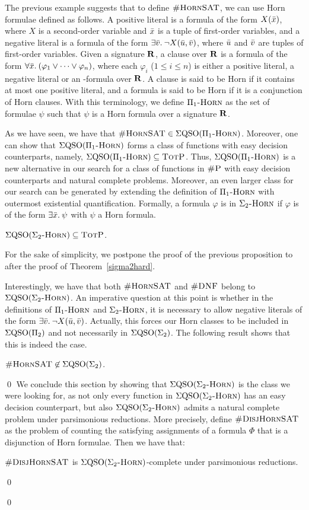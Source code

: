 The previous example suggests that to define $\textsc{\#HornSAT}$, we can use Horn formulae defined as follows. 
A positive literal is a formula of the form $X(\bar{x})$, where $X$ is a second-order variable and $\bar{x}$ is a tuple of first-order variables, and a negative literal is a formula of the form $\exists{\bar{v}}.\: \neg X(\bar{u},\bar{v})$, where $\bar{u}$ and $\bar{v}$ are tuples of first-order variables. Given a signature $\mathbf{R}$, a clause over $\mathbf{R}$ is a formula of the form $\forall{\bar{x}}.\: (\varphi_1 \vee \cdots \vee \varphi_n)$, 
where each $\varphi_i$ ($1 \leq i \leq n$) is either a positive literal, a negative literal or an \fo-formula over $\mathbf{R}$.  A clause is said to be Horn if it contains at most one positive literal, and a formula is said to be Horn if it is a conjunction of Horn clauses. With this terminology, we define $\Pi_1\textsc{-Horn}$ as the set of formulae $\psi$ such that $\psi$ is a Horn formula over a signature $\mathbf{R}$. 

As we have seen, we have that $\textsc{\#HornSAT} \in \Sigma{\rm QSO}(\Pi_1\textsc{-Horn})$. Moreover, one can show that $\Sigma{\rm QSO}(\Pi_1\textsc{-Horn})$ forms a class of functions with easy decision counterparts, namely, $\Sigma{\rm QSO}(\Pi_1\textsc{-Horn}) \subseteq \text{\sc TotP}$.
Thus, $\Sigma{\rm QSO}(\Pi_1\textsc{-Horn})$ is a new alternative in our search for a class of functions in $\text{\sc \#P}$ with easy decision counterparts and natural complete problems. Moreover, an even larger class for our search can be generated by extending the definition of $\Pi_1\textsc{-Horn}$ with outermost existential quantification. 
Formally, a formula $\varphi$ is in $\Sigma_2\textsc{-Horn}$ if $\varphi$ is of the form $\exists{\bar x}.\: \psi$ with $\psi$ a Horn formula. 

\begin{prop}\label{prop:ehorn-pe}
$\Sigma{\rm QSO}(\Sigma_2\textsc{-Horn}) \subseteq \text{\sc TotP}$.
\end{prop}
For the sake of simplicity, we postpone the proof of the previous proposition to after the proof of Theorem~\ref{sigma2hard}.

Interestingly, we have that both $\textsc{\#HornSAT}$ and $\textsc{\#DNF}$ belong to $\Sigma{\rm QSO}(\Sigma_2\textsc{-Horn})$. 
An imperative question at this point is whether in the definitions of $\Pi_1\textsc{-Horn}$ and $\Sigma_2\textsc{-Horn}$, it is necessary to allow negative literals of the form $\exists{\bar{v}}.\: \neg X(\bar{u},\bar{v})$. Actually, this forces our Horn classes to be included in $\Sigma{\rm QSO}(\Pi_{2})$ and not necessarily in $\Sigma{\rm QSO}(\Sigma_{2})$. The following result shows that this is indeed the case.

\begin{prop}\label{prop:hsat-not-sigma2}	
$\textsc{\#HornSAT} \not\in \Sigma{\rm QSO}(\Sigma_{2})$.
\end{prop}
\proof

\qed
We conclude this section by showing that $\Sigma{\rm QSO}(\Sigma_2\textsc{-Horn})$ is the class we were looking for, as not only every function in $\Sigma{\rm QSO}(\Sigma_2\textsc{-Horn})$ has an easy decision counterpart, but also $\Sigma{\rm QSO}(\Sigma_2\textsc{-Horn})$ admits a natural complete problem under parsimonious reductions. More precisely, define 
$\textsc{\#DisjHornSAT}$ as the problem of counting the satisfying assignments of a formula $\Phi$ that is a disjunction of Horn formulae. Then we have that:

\begin{thm} \label{sigma2hard}
	$\textsc{\#DisjHornSAT}$ is $\Sigma{\rm QSO}(\Sigma_2\textsc{-Horn})$-complete under parsimonious reductions. 
\end{thm}
\proof

\qed


\qed
